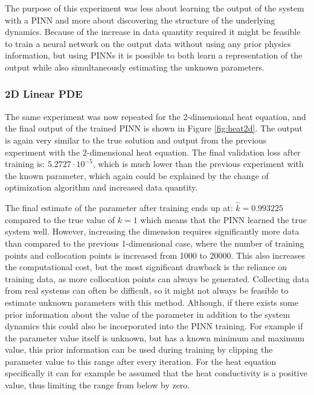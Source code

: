 The purpose of this experiment was less about learning the output of the system with a PINN and more about discovering the structure of the underlying dynamics. Because of the increase in data quantity required it might be feasible to train a neural network on the output data without using any prior physics information, but using PINNs it is possible to both learn a representation of the output while also simultaneously estimating the unknown parameters.

\subsubsection{2D Linear PDE}

The same experiment was now repeated for the 2-dimensional heat equation, and the final output of the trained PINN is shown in Figure \ref{fig:heat2d}. The output is again very similar to the true solution and output from the previous experiment with the 2-dimensional heat equation. The final validation loss after training is: $5.2727 \cdot 10^{-5}$, which is much lower than the previous experiment with the known parameter, which again could be explained by the change of optimization algorithm and increased data quantity.

The final estimate of the parameter after training ends up at: $\hat{k} = 0.993225$ compared to the true value of $k = 1$ which means that the PINN learned the true system well. However, increasing the dimension requires significantly more data than compared to the previous 1-dimensional case, where the number of training points and collocation points is increased from 1000 to 20000. This also increases the computational cost, but the most significant drawback is the reliance on training data, as more collocation points can always be generated. Collecting data from real systems can often be difficult, so it might not always be feasible to estimate unknown parameters with this method. Although, if there exists some prior information about the value of the parameter in addition to the system dynamics this could also be incorporated into the PINN training. For example if the parameter value itself is unknown, but has a known minimum and maximum value, this prior information can be used during training by clipping the parameter value to this range after every iteration. For the heat equation specifically it can for example be assumed that the heat conductivity is a positive value, thus limiting the range from below by zero.

